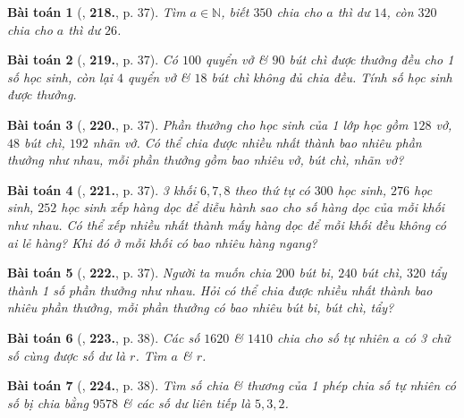 \documentclass{article}
\numberwithin{equation}{section}
\newtheorem{baitoan}{Bài toán}[section]
\begin{document}
\begin{baitoan}[\cite{Binh_Toan_6_tap_1}, \textbf{218.}, p. 37]
	Tìm $a\in\mathbb{N}$, biết $350$ chia cho $a$ thì dư $14$, còn $320$ chia cho $a$ thì dư $26$.
\end{baitoan}

\begin{baitoan}[\cite{Binh_Toan_6_tap_1}, \textbf{219.}, p. 37]
	Có $100$ quyển vở \& $90$ bút chì được thưởng đều cho 1 số học sinh, còn lại $4$ quyển vở \& $18$ bút chì không đủ chia đều. Tính số học sinh được thưởng.
\end{baitoan}

\begin{baitoan}[\cite{Binh_Toan_6_tap_1}, \textbf{220.}, p. 37]
	Phần thưởng cho học sinh của 1 lớp học gồm $128$ vở, $48$ bút chì, $192$ nhãn vở. Có thể chia được nhiều nhất thành bao nhiêu phần thưởng như nhau, mỗi phần thưởng gồm bao nhiêu vở, bút chì, nhãn vở?
\end{baitoan}

\begin{baitoan}[\cite{Binh_Toan_6_tap_1}, \textbf{221.}, p. 37]
	3 khối $6,7,8$ theo thứ tự có $300$ học sinh, $276$ học sinh, $252$ học sinh xếp hàng dọc để diễu hành sao cho số hàng dọc của mỗi khối như nhau. Có thể xếp nhiều nhất thành mấy hàng dọc để mỗi khối đều không có ai lẻ hàng? Khi đó ở mỗi khối có bao nhiêu hàng ngang?
\end{baitoan}

\begin{baitoan}[\cite{Binh_Toan_6_tap_1}, \textbf{222.}, p. 37]
	Người ta muốn chia $200$ bút bi, $240$ bút chì, $320$ tẩy thành 1 số phần thưởng như nhau. Hỏi có thể chia được nhiều nhất thành bao nhiêu phần thưởng, mỗi phần thưởng có bao nhiêu bút bi, bút chì, tẩy?
\end{baitoan}

\begin{baitoan}[\cite{Binh_Toan_6_tap_1}, \textbf{223.}, p. 38]
	Các số $1620$ \& $1410$ chia cho số tự nhiên $a$ có 3 chữ số cùng được số dư là $r$. Tìm $a$ \& $r$.
\end{baitoan}

\begin{baitoan}[\cite{Binh_Toan_6_tap_1}, \textbf{224.}, p. 38]
	Tìm số chia \& thương của 1 phép chia số tự nhiên có số bị chia bằng $9578$ \& các số dư liên tiếp là $5,3,2$.
\end{baitoan}

\end{document}
